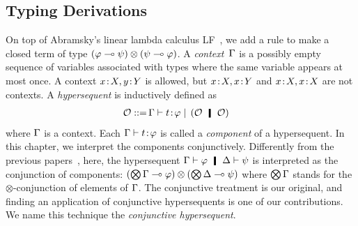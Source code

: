 \subsection{Typing Derivations}

On top of Abramsky's linear lambda calculus
LF~\citep{abramsky1993computational}, we add a rule to
make a closed term of type $(\varphi\multimap\psi)\otimes(\psi\multimap\varphi)$.
A \textit{context}~$\Gamma$ is a possibly empty sequence of
variables associated with
types where the same variable appears at most once.
A context ${x} \mathord{\colon\kern -2pt}{X}, {y} \mathord{\colon\kern -2pt}{Y}$ is allowed, but ${x} \mathord{\colon\kern -2pt}{X}, {x} \mathord{\colon\kern -2pt}{Y}$
and ${x} \mathord{\colon\kern -2pt}{X},{x} \mathord{\colon\kern -2pt}{X}$ are not contexts.
A \textit{hypersequent} is inductively defined as
\begin{align*}
 \hypert ::=\, &\G\tr\tj{t}{\phi}
 \mid\, (\hypert\hmid \hypert)
\end{align*}
where $\Gamma$ is a context.
Each $\Gamma\vdash{t} \mathord{\colon\kern -2pt}{\varphi}$ is called a \textit{component}
of a hypersequent.
In this chapter, we interpret the components conjunctively.
Differently from the previous
papers~\citep{avron91,Baaz01122003,avrontableau,avron96},
here, the hypersequent $\G\tr\phi\hmid \D\tr\psi$ is interpreted as the
conjunction of components:
$(\bigotimes\Gamma\multimap\varphi)\otimes (\bigotimes\Delta\multimap\psi)$ where
$\bigotimes\Gamma$ stands for the $\otimes$-conjunction of elements of $\Gamma$.
The conjunctive treatment is our original, and finding an application
of conjunctive hypersequents is one of our contributions.
We name this technique the \textit{conjunctive
hypersequent}.

